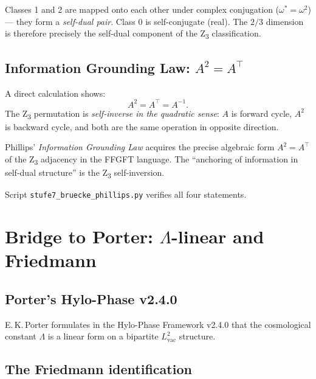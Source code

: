 Classes 1 and 2 are mapped onto each other under complex conjugation (\(\omega^* = \omega^2\)) --- they form a \emph{self-dual pair}. Class 0 is self-conjugate (real). The \(2/3\) dimension is therefore precisely the self-dual component of the Z\textsubscript{3} classification.

\subsection[Information Grounding Law: A^2 = A^T]{Information Grounding Law: \texorpdfstring{\(A^2 = A^\top\)}{A2 = AT}}

A direct calculation shows:
\begin{equation}
A^2 = A^\top = A^{-1}.
\label{eq:igl}
\end{equation}
The Z\textsubscript{3} permutation is \emph{self-inverse in the quadratic sense}: \(A\) is forward cycle, \(A^2\) is backward cycle, and both are the same operation in opposite direction.

\begin{interpretation}
Phillips' \emph{Information Grounding Law} acquires the precise algebraic form \(A^2 = A^\top\) of the Z\textsubscript{3} adjacency in the FFGFT language. The ``anchoring of information in self-dual structure'' is the Z\textsubscript{3} self-inversion.
\end{interpretation}

Script \texttt{stufe7\_bruecke\_phillips.py} verifies all four statements.

\section[Bridge to Porter: Lambda-linear and Friedmann]{Bridge to Porter: \texorpdfstring{\(\Lambda\)-linear}{Lambda-linear} and Friedmann}
\label{sec:porter}

\subsection{Porter's Hylo-Phase v2.4.0}

E.\,K.\,Porter formulates in the Hylo-Phase Framework v2.4.0 that the cosmological constant \(\Lambda\) is a linear form on a bipartite \(L_\text{vac}^2\) structure.

\subsection{The Friedmann identification}

